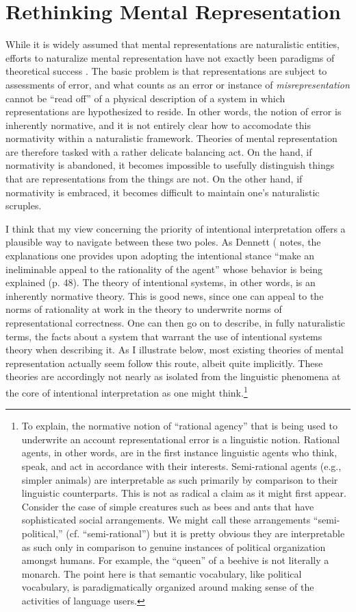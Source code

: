\section{Rethinking Mental Representation}

While it is widely assumed that mental representations are naturalistic entities, efforts to naturalize mental representation have not exactly been paradigms of theoretical success \citep[][Ch. 3]{Horwich:2005}. The basic problem is that representations are subject to assessments of error, and what counts as an error or instance of \textit{misrepresentation} cannot be ``read off'' of a physical description of a system in which representations are hypothesized to reside. In other words, the notion of error is inherently normative, and it is not entirely clear how to accomodate this normativity within a naturalistic framework. Theories of mental representation are therefore tasked with a rather delicate balancing act. On the hand, if normativity is abandoned, it becomes impossible to usefully distinguish things that are representations from the things are not. On the other hand, if normativity is embraced, it becomes difficult to maintain one's naturalistic scruples. 

I think that my view concerning the priority of intentional interpretation offers a plausible way to navigate between these two poles. As Dennett (\citeyear{Dennett:1987)} notes, the explanations one provides upon adopting the intentional stance ``make an ineliminable appeal to the rationality of the agent'' whose behavior is being explained (p. 48). The theory of intentional systems, in other words, is an inherently normative theory. This is good news, since one can appeal to the norms of rationality at work in the theory to underwrite norms of representational correctness. One can then go on to describe, in fully naturalistic terms, the facts about a system that warrant the use of intentional systems theory when describing it. As I illustrate below, most existing theories of mental representation actually seem follow this route, albeit quite implicitly. These theories are accordingly not nearly as isolated from the linguistic phenomena at the core of intentional interpretation as one might think.\footnote{To explain, the normative notion of ``rational agency'' that is being used to underwrite an account representational error is a linguistic notion. Rational agents, in other words, are in the first instance linguistic agents who think, speak, and act in accordance with their interests. Semi-rational agents (e.g., simpler animals) are interpretable as such primarily by comparison to their linguistic counterparts. This is not as radical a claim as it might first appear. Consider the case of simple creatures such as bees and ants that have sophisticated social arrangements. We might call these arrangements ``semi-political,'' (cf. ``semi-rational'') but it is pretty obvious they are interpretable as such only in comparison to genuine instances of political organization amongst humans. For example, the ``queen'' of a beehive is not literally a monarch. The point here is that semantic vocabulary, like political vocabulary, is paradigmatically organized around making sense of the activities of language users.}

